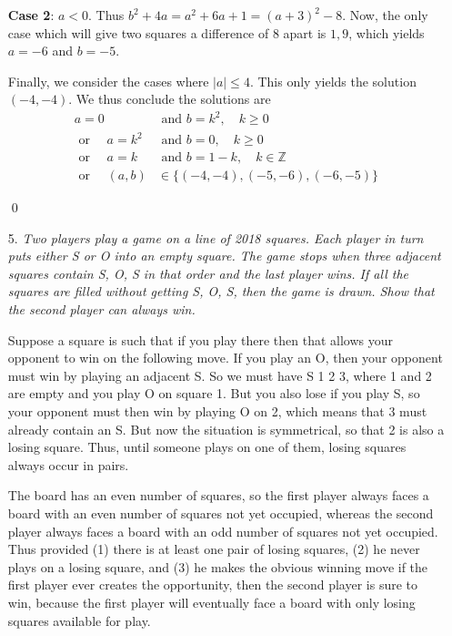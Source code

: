 \documentclass[a4paper, 12pt]{article}
\begin{document}
\begin{enumerate}
\textbf{Case 2}: $a < 0$. Thus $b^2 + 4a = a^2 + 6a + 1 = (a + 3)^2 - 8$. Now, the only case which will give two squares a difference of 8 apart is $1, 9$, which yields $a = -6$ and $b = -5$.

Finally, we consider the cases where $|a| \leq 4$. This only yields the solution $(-4, -4)$. We thus conclude the solutions are
\begin{align*}
    a = 0 &\textrm{ and } b = k^2, \quad k \geq 0 \\
    \textrm{ or } \quad a = k^2 &\textrm{ and } b = 0, \quad k \geq 0 \\
    \textrm{ or } \quad a = k &\textrm{ and } b = 1-k, \quad k \in \mathbb{Z} \\
    \textrm{ or } \quad (a, b) &\in \{(-4, -4), (-5, -6), (-6, -5) \}
\end{align*}

\qed


\vspace{5mm}
\item[5.]  \textit{Two players play a game on a line of 2018 squares. Each player in turn puts either S or O into an empty square. The game stops when three adjacent squares contain S, O, S in that order and the last player wins. If all the squares are filled without getting S, O, S, then the game is drawn. Show that the second player can always win.}

Suppose a square is such that if you play there then that allows your opponent to win on the following move. If you play an O, then your opponent must win by playing an adjacent S. So we must have S 1 2 3, where 1 and 2 are empty and you play O on square 1. But you also lose if you play S, so your opponent must then win by playing O on 2, which means that 3 must already contain an S. But now the situation is symmetrical, so that 2 is also a losing square. Thus, until someone plays on one of them, losing squares always occur in pairs.

The board has an even number of squares, so the first player always faces a board with an even number of squares not yet occupied, whereas the second player always faces a board with an odd number of squares not yet occupied. Thus provided (1) there is at least one pair of losing squares, (2) he never plays on a losing square, and (3) he makes the obvious winning move if the first player ever creates the opportunity, then the second player is sure to win, because the first player will eventually face a board with only losing squares available for play.


\end{enumerate}
\end{document}
